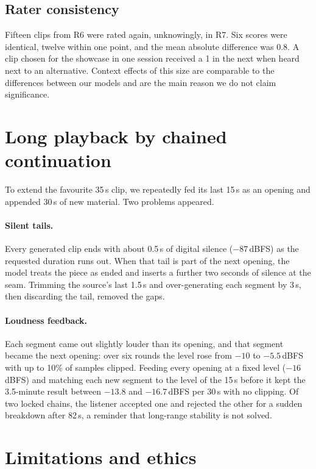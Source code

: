 \documentclass[11pt]{article}
\begin{document}
\subsection{Rater consistency}

Fifteen clips from R6 were rated again, unknowingly, in R7. Six scores were identical, twelve within one point,
and the mean absolute difference was 0.8. A clip chosen for the showcase in one session received a 1 in the next
when heard next to an alternative. Context effects of this size are comparable to the differences between our
models and are the main reason we do not claim significance.

\section{Long playback by chained continuation}\label{sec:chain}

To extend the favourite 35\,s clip, we repeatedly fed its last 15\,s as an opening and appended 30\,s of new
material. Two problems appeared.

\paragraph{Silent tails.} Every generated clip ends with about 0.5\,s of digital silence ($-87$\,dBFS) as the
requested duration runs out. When that tail is part of the next opening, the model treats the piece as ended and
inserts a further two seconds of silence at the seam. Trimming the source's last 1.5\,s and over-generating each
segment by 3\,s, then discarding the tail, removed the gaps.

\paragraph{Loudness feedback.} Each segment came out slightly louder than its opening, and that segment became the
next opening: over six rounds the level rose from $-10$ to $-5.5$\,dBFS with up to 10\% of samples clipped. Feeding
every opening at a fixed level ($-16$\,dBFS) and matching each new segment to the level of the 15\,s before it kept
the 3.5-minute result between $-13.8$ and $-16.7$\,dBFS per 30\,s with no clipping. Of two locked chains, the listener accepted one
and rejected the other for a sudden breakdown after 82\,s, a reminder that long-range stability is not solved.

\section{Limitations and ethics}\label{sec:limits}
\end{document}
